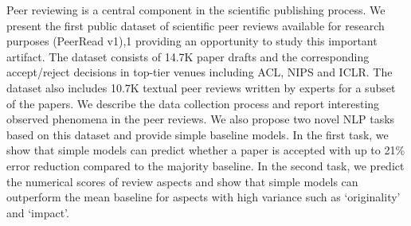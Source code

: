 Peer reviewing is a central component in the scientific publishing process. We present the first public dataset of scientific peer reviews available for research purposes (PeerRead v1),1 providing an opportunity to study this important artifact. The dataset consists of 14.7K paper drafts and the corresponding accept/reject decisions in top-tier venues including ACL, NIPS and ICLR. The dataset also includes 10.7K textual peer reviews written by experts for a subset of the papers. We describe the data collection process and report interesting observed phenomena in the peer reviews. We also propose two novel NLP tasks based on this dataset and provide simple baseline models. In the first task, we show that simple models can predict whether a paper is accepted with up to 21\% error reduction compared to the majority baseline. In the second task, we predict the numerical scores of review aspects and show that simple models can outperform the mean baseline for aspects with high variance such as ‘originality' and ‘impact'.
